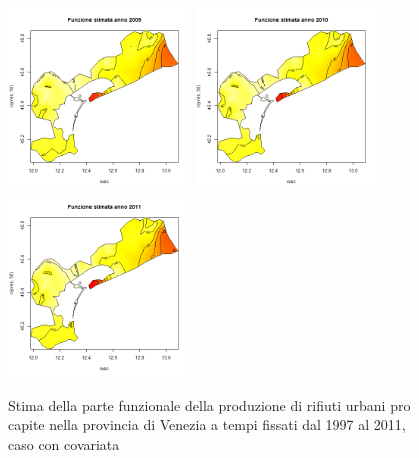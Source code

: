 \documentclass[a4paper,11pt,twoside,openright]{book}							%
\begin{document}
\begin{figure}[H]
	\includegraphics[width=0.43\textwidth ,height=0.235\textheight]{Immagini/venezia_con_covariate/Anno2009.png}
	\includegraphics[width=0.43\textwidth ,height=0.235\textheight]{Immagini/venezia_con_covariate/Anno2010.png}
	\includegraphics[width=0.43\textwidth ,height=0.235\textheight]{Immagini/venezia_con_covariate/Anno2011.png}
\caption{Stima della parte funzionale della produzione di rifiuti urbani pro capite nella provincia di Venezia a tempi fissati dal 1997 al 2011, caso con covariata}
\label{fig:Vencovar_ris}
\end{figure}
\newpage
\end{document}
